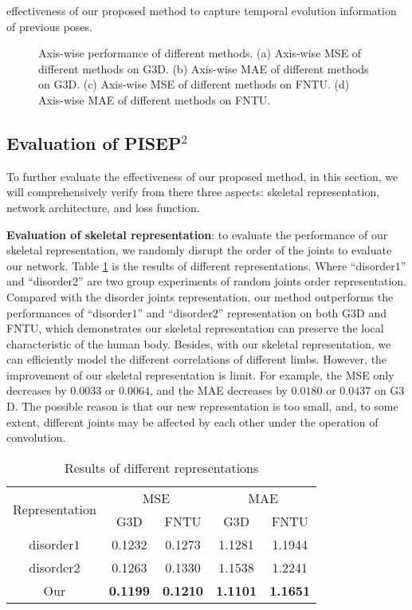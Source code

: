 \documentclass[journal]{IEEEtran}
\begin{document}
effectiveness of our proposed method to capture temporal evolution information of previous poses.

\begin{figure}[!t]
\centering
{}
\hfil
{}
\hfil
{}
\hfil
{}
\caption{Axis-wise performance of different methods. (a) Axis-wise MSE of different methods on G${3}$D. (b) Axis-wise MAE of different methods on G${3}$D. (c) Axis-wise MSE of different methods on FNTU. (d) Axis-wise MAE of different methods on FNTU. }
\label{fig8}
\end{figure}

\subsection{Evaluation of PISEP${^2}$}
To further evaluate the effectiveness of our proposed method, in this section, we will comprehensively verify from there three aspects: skeletal representation, network architecture, and loss function.

{\bf Evaluation of skeletal representation}: to evaluate the performance of our skeletal representation, we randomly disrupt the order of the joints to evaluate our network. Table \ref{table2} is the results of different representations. Where ``disorder${1}$'' and ``disorder${2}$'' are two group experiments of random joints order representation. Compared with the disorder joints representation, our method outperforms the performances of ``disorder${1}$'' and ``disorder${2}$'' representation on both G${3}$D and FNTU, which demonstrates our skeletal representation can preserve the local characteristic of the human body. Besides, with our skeletal representation, we can efficiently model the different correlations of different limbs. However, the improvement of our skeletal representation is limit. For example, the MSE only decreases by ${0.0033}$ or ${0.0064}$, and the MAE decreases by ${0.0180}$ or ${0.0437}$ on G${3}$D. The possible reason is that our new representation is too small, and, to some extent, different joints may be affected by each other under the operation of convolution.

\begin{table}[!t]
\renewcommand{\arraystretch}{1.3}
\caption{Results of different representations}
\label{table2}
\centering
\begin{tabular}{ccccc}
\hline
\multirow{2}{*}{Representation}& \multicolumn{2}{c}{MSE} & \multicolumn{2}{c}{MAE} \\
 \cline{2-5}& G3D &FNTU & G3D &FNTU \\
\hline
disorder${1}$&0.1232&0.1273&1.1281&1.1944 \\
disorder${2}$&0.1263&0.1330&1.1538&1.2241 \\
Our&{\bf 0.1199}&{\bf 0.1210}&{\bf 1.1101}&{\bf 1.1651} \\
\hline
\end{tabular}
\end{table}
\end{document}
